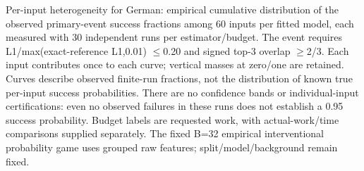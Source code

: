 Per-input heterogeneity for German: empirical cumulative distribution of the observed primary-event success fractions among 60 inputs per fitted model, each measured with 30 independent runs per estimator/budget. The event requires L1/max(exact-reference L1,0.01) $\leq$0.20 and signed top-3 overlap $\geq$2/3. Each input contributes once to each curve; vertical masses at zero/one are retained. Curves describe observed finite-run fractions, not the distribution of known true per-input success probabilities. There are no confidence bands or individual-input certifications: even no observed failures in these runs does not establish a 0.95 success probability. Budget labels are requested work, with actual-work/time comparisons supplied separately. The fixed B=32 empirical interventional probability game uses grouped raw features; split/model/background remain fixed.

